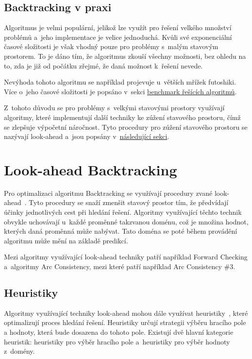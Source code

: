\subsection{Backtracking v praxi}

Algoritmus je velmi populární, jelikož lze využít pro řešení velkého množství
problémů a~jeho implementace je velice jednoduchá. Kvůli své exponenciální
časové složitosti je však vhodný pouze pro problémy s~malým stavovým prostorem.
To je dáno tím, že algoritmus zkouší všechny možnosti, bez ohledu na to, zda je
již od počátku zřejmé, že daná možnost k~řešení nevede.

Nevýhoda tohoto algoritmu se například projevuje u~větších mřížek futoshiki.
Více o~jeho časové složitosti je popsáno v~sekci
\hyperref[sec:timeComplexity]{benchmark řešících algoritmů}.

Z~tohoto důvodu se pro problémy s~velkými stavovými prostory využívají
algoritmy, které implementují další techniky ke zúžení stavového prostoru, čímž
se zlepšuje výpočetní náročnost. Tyto procedury pro zúžení stavového prostoru
se nazývají look-ahead a~jsou popsány
v~\hyperref[sec:lookAhead]{následující sekci}.

\section{Look-ahead Backtracking}
\label{sec:lookAhead}

Pro optimalizaci algoritmu Backtracking se využívají procedury zvané
look-ahead~\cite{LookAheadWiki}. Tyto procedury se snaží zmenšit stavový
prostor tím, že předvídají účinky jednotlivých cest při hledání řešení.
Algoritmy využívající těchto technik obvykle uchovávají u~každé proměnné
takzvanou doménu, což je množina hodnot, kterých daná proměnná může nabývat.
Tato doména se poté během provádění algoritmu může mění na základě predikcí.

Mezi algoritmy využívající look-ahead techniky patří například Forward Checking
a~algoritmy Arc Consistency, mezi které patří například Arc Consistency \#3.

\subsection{Heuristiky}

Algoritmy využívající techniky look-ahead mohou dále využívat
heuristiky~\cite{PrednaskyIZU}, které optimalizují proces hledání řešení.
Heuristiky určují strategii výběru hracího pole a hodnoty, která bude dosazena
do tohoto pole. Existují dvě hlavní kategorie heuristik: heuristiky pro výběr
hracího pole a~heuristiky pro výběr hodnoty z~domény.

